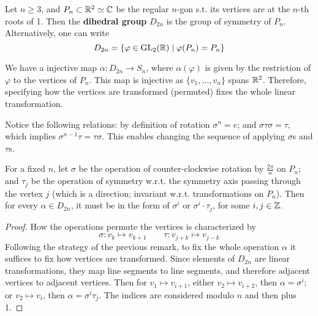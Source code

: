 \begin{definition}
    Let $n \geq 3$, and $P_n \subset \mathbb{R}^2 \simeq \mathbb{C}$ be the regular $n$-gon s.t. its vertices are at the $n$-th roots of 1. Then the \textbf{dihedral group} $D_{2n}$ is the group of symmetry of $P_n$. Alternatively, one can write
    \[
        D_{2n} = \{ \varphi \in \mathrm{GL}_2(\mathbb{R}) \mid \varphi(P_n) = P_n \}
    \]
\end{definition}

\begin{remark}
    We have a injective map $\alpha: D_{2n} \to S_n$, where $\alpha(\varphi)$ is given by the restriction of $\varphi$ to the vertices of $P_n$. This map is injective as $\{v_1, \dots, v_n\}$ spans $\mathbb{R}^2$. Therefore, specifying how the vertices are transformed (permuted) fixes the whole linear transformation.
\end{remark}

\begin{remark} \label{rmk: rule of computing dihedral group}
    Notice the following relations: by definition of rotation $\sigma^n = e$; and $\sigma \tau \sigma = \tau$, which implies $\sigma^{n-1} \tau = \tau \sigma$. This enables changing the sequence of applying $\sigma$s and $\tau$s.
\end{remark}

\begin{proposition}
    For a fixed $n$, let $\sigma$ be the operation of counter-clockwise rotation by $\frac{2\pi}{n}$ on $P_n$; and $\tau_j$ be the operation of symmetry w.r.t. the symmetry axis passing through the vertex $j$ (which is a direction; invariant w.r.t. transformations on $P_n$). Then for every $\alpha \in D_{2n}$, it must be in the form of $\sigma^i$ or $\sigma^i \cdot \tau_j$, for some $i, j \in \mathbb{Z}$.
\end{proposition}

\begin{proof}
    How the operations permute the vertices is characterized by
    \[
        \sigma: v_k \mapsto v_{k + 1} \qquad \tau: v_{j+k} \mapsto v_{j-k}
    \]
    Following the strategy of the previous remark, to fix the whole operation $\alpha$ it suffices to fix how vertices are transformed. Since elements of $D_{2n}$ are linear transformations, they map line segments to line segments, and therefore adjacent vertices to adjacent vertices. Then for $v_1 \mapsto v_{i+1}$, either $v_2 \mapsto v_{i+2}$, then $\alpha = \sigma^i$; or $v_2 \mapsto v_{i}$, then $\alpha = \sigma^i \tau_j$. The indices are considered modulo $n$ and then plus 1. 
\end{proof}


